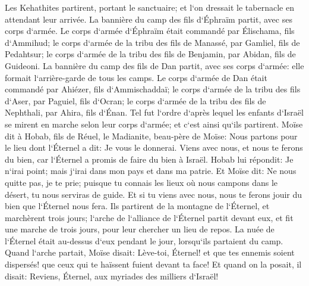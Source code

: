 \verse Les Kehathites partirent, portant le sanctuaire; et l`on dressait le tabernacle en attendant leur arrivée. 
\verse La bannière du camp des fils d`Éphraïm partit, avec ses corps d`armée. Le corps d`armée d`Éphraïm était commandé par Élischama, fils d`Ammihud; 
\verse le corps d`armée de la tribu des fils de Manassé, par Gamliel, fils de Pedahtsur; 
\verse le corps d`armée de la tribu des fils de Benjamin, par Abidan, fils de Guideoni. 
\verse La bannière du camp des fils de Dan partit, avec ses corps d`armée: elle formait l`arrière-garde de tous les camps. Le corps d`armée de Dan était commandé par Ahiézer, fils d`Ammischaddaï; 
\verse le corps d`armée de la tribu des fils d`Aser, par Paguiel, fils d`Ocran; 
\verse le corps d`armée de la tribu des fils de Nephthali, par Ahira, fils d`Énan. 
\verse Tel fut l`ordre d`après lequel les enfants d`Israël se mirent en marche selon leur corps d`armée; et c`est ainsi qu`ils partirent. 
\verse Moïse dit à Hobab, fils de Réuel, le Madianite, beau-père de Moïse: Nous partons pour le lieu dont l`Éternel a dit: Je vous le donnerai. Viens avec nous, et nous te ferons du bien, car l`Éternel a promis de faire du bien à Israël. 
\verse Hobab lui répondit: Je n`irai point; mais j`irai dans mon pays et dans ma patrie. 
\verse Et Moïse dit: Ne nous quitte pas, je te prie; puisque tu connais les lieux où nous campons dans le désert, tu nous serviras de guide. 
\verse Et si tu viens avec nous, nous te ferons jouir du bien que l`Éternel nous fera. 
\verse Ils partirent de la montagne de l`Éternel, et marchèrent trois jours; l`arche de l`alliance de l`Éternel partit devant eux, et fit une marche de trois jours, pour leur chercher un lieu de repos. 
\verse La nuée de l`Éternel était au-dessus d`eux pendant le jour, lorsqu`ils partaient du camp. 
\verse Quand l`arche partait, Moïse disait: Lève-toi, Éternel! et que tes ennemis soient dispersés! que ceux qui te haïssent fuient devant ta face! 
\verse Et quand on la posait, il disait: Reviens, Éternel, aux myriades des milliers d`Israël! 

